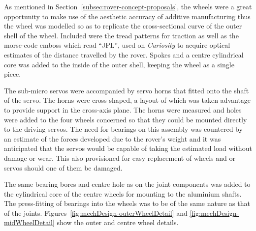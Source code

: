         As mentioned in Section~\ref{subsec:rover-concept-proposals}, the wheels were a great opportunity to make use of the aesthetic accuracy of additive manufacturing thus the wheel was modelled so as to replicate the cross-sectional curve of the outer shell of the wheel. Included were the tread patterns for traction as well as the morse-code emboss which read ``JPL'', used on \textit{Curiosity} to acquire optical estimates of the distance travelled by the rover. Spokes and a centre cylindrical core was added to the inside of the outer shell, keeping the wheel as a single piece.
        
        The sub-micro servos were accompanied by servo horns that fitted onto the shaft of the servo. The horns were cross-shaped, a layout of which was taken advantage to provide support in the cross-axis plane. The horns were measured and holes were added to the four wheels concerned so that they could be mounted directly to the driving servos. The need for bearings on this assembly was countered by an estimate of the forces developed due to the rover's weight and it was anticipated that the servos would be capable of taking the estimated load without damage or wear. This also provisioned for easy replacement of wheels and or servos should one of them be damaged.
        
        The same bearing bores and centre hole as on the joint components was added to the cylindrical core of the centre wheels for mounting to the aluminium shafts. The press-fitting of bearings into the wheels was to be of the same nature as that of the joints. Figures~\ref{fig:mechDesign-outerWheelDetail} and \ref{fig:mechDesign-midWheelDetail} show the outer and centre wheel details.
        
